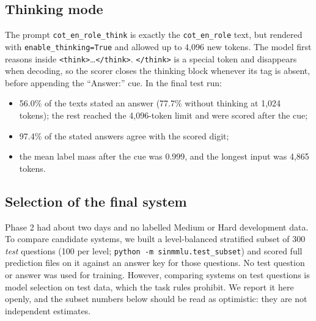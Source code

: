 \documentclass[10pt,a4paper]{article}
\newcommand{\cond}[1]{\texttt{#1}}
\begin{document}
\subsection{Thinking mode}\label{sec:thinking}
The prompt \cond{cot\_en\_role\_think} is exactly the \cond{cot\_en\_role} text, but rendered with
\texttt{enable\_thinking=True} and allowed up to 4,096 new tokens. The model first reasons inside
\texttt{<think>}\ldots\texttt{</think>}. \texttt{</think>} is a special token and disappears when decoding, so the
scorer closes the thinking block whenever its tag is absent, before appending the ``Answer:'' cue. In the final test
run:
\begin{itemize}
\item 56.0\% of the texts stated an answer (77.7\% without thinking at 1,024 tokens); the rest reached the 4,096-token
limit and were scored after the cue;
\item 97.4\% of the stated answers agree with the scored digit;
\item the mean label mass after the cue was 0.999, and the longest input was 4,865 tokens.
\end{itemize}

\subsection{Selection of the final system}\label{sec:final_select}
Phase 2 had about two days and no labelled Medium or Hard development data. To compare candidate systems, we built a
level-balanced stratified subset of 300 \emph{test} questions (100 per level; \texttt{python -m sinmmlu.test\_subset})
and scored full prediction files on it against an answer key for those questions. No test question or answer was used
for training. However, comparing systems on test questions is model selection on test data, which the task rules
prohibit. We report it here openly, and the subset numbers below should be read as optimistic: they are not
independent estimates.
\end{document}
